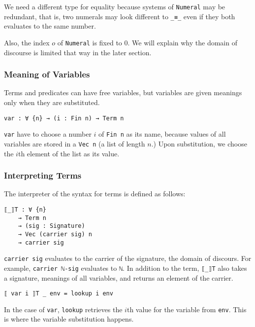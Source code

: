 \documentclass[\main/thesis.tex]{subfiles}
\begin{document}
We need a different type for equality because systems of \lstinline|Numeral|
may be redundant, that is, two numerals may look different to \lstinline|_≡_|
even if they both evaluates to the same number.

Also, the index $ o $ of \lstinline|Numeral| is fixed to $ 0 $.
We will explain why the domain of discourse is limited that way in the
later section.

\subsubsection{Meaning of Variables}

Terms and predicates can have free variables, but variables are given
meanings only when they are substituted.

\begin{lstlisting}
var : ∀ {n} → (i : Fin n) → Term n
\end{lstlisting}

\lstinline|var| have to choose a number $ i $ of \lstinline|Fin n| as its name,
because values of all variables are stored in a \lstinline|Vec n| (a list of length $ n $.)
Upon substitution, we choose the $ i $th element of the list as its value.

\subsubsection{Interpreting Terms}

The interpreter of the syntax for terms is defined as follows:

\begin{lstlisting}
⟦_⟧T : ∀ {n}
    → Term n
    → (sig : Signature)
    → Vec (carrier sig) n
    → carrier sig
\end{lstlisting}

\lstinline|carrier sig| evaluates to the carrier of the signature, the domain
of discours. For example, \lstinline|carrier ℕ-sig| evaluates to \lstinline|ℕ|.
In addition to the term, \lstinline|⟦_⟧T| also takes a signature, meanings of
all variables, and returns an element of the carrier.

\begin{lstlisting}
⟦ var i ⟧T _ env = lookup i env
\end{lstlisting}

In the case of \lstinline|var|,
\lstinline|lookup| retrieves the $i$th value for the variable from \lstinline|env|.
This is where the variable substitution happens.
\end{document}
